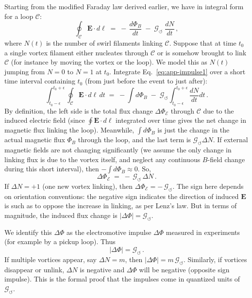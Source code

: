 \documentclass[12pt]{article}
\begin{document}
{Starting from the modified Faraday law derived earlier, we have in integral form for a loop $\mathcal{C}$:
\begin{equation}\label{eq:app-impulse1}
\oint_{\mathcal{C}} \mathbf{E}\cdot d\boldsymbol{\ell} \;=\; -\,\frac{d\Phi_{B}}{dt} \;-\; \mathcal{G}_{\!\boldsymbol{\circlearrowleft}}\;\frac{dN}{dt}\,,
\end{equation}
where $N(t)$ is the number of swirl filaments linking $\mathcal{C}$. Suppose that at time $t_0$ a single vortex filament either nucleates through $\mathcal{C}$ or is somehow brought to link $\mathcal{C}$ (for instance by moving the vortex or the loop). We model this as $N(t)$ jumping from $N=0$ to $N=1$ at $t_0$. Integrate Eq.~\eqref{eq:app-impulse1} over a short time interval containing $t_0$ (from just before the event to just after):
\begin{equation}\label{eq:app-impulse2}
\int_{t_0-\epsilon}^{t_0+\epsilon} \oint_{\mathcal{C}} \mathbf{E}\cdot d\boldsymbol{\ell}\, dt \;=\; -\int d\Phi_{B} \;-\; \mathcal{G}_{\!\boldsymbol{\circlearrowleft}} \int_{t_0-\epsilon}^{t_0+\epsilon} \frac{dN}{dt}dt\,.
\end{equation}
By definition, the left side is the total flux change $\Delta \Phi_{\mathcal{E}}$ through $\mathcal{C}$ due to the induced electric field (since $\oint \mathbf{E}\cdot d\ell$ integrated over time gives the net change in magnetic flux linking the loop). Meanwhile, $\int d\Phi_{B}$ is just the change in the actual magnetic flux $\Phi_{B}$ through the loop, and the last term is $\mathcal{G}_{\!\boldsymbol{\circlearrowleft}}\Delta N$. If external magnetic fields are not changing significantly (we assume the only change in linking flux is due to the vortex itself, and neglect any continuous $B$-field change during this short interval), then $-\int d\Phi_{B} \approx 0$. So,
\[
\Delta \Phi_{\mathcal{E}} \;=\; -\,\mathcal{G}_{\!\boldsymbol{\circlearrowleft}}\,\Delta N\,.
\]
If $\Delta N = +1$ (one new vortex linking), then $\Delta \Phi_{\mathcal{E}} = -\,\mathcal{G}_{\!\boldsymbol{\circlearrowleft}}$. The sign here depends on orientation conventions: the negative sign indicates the direction of induced $\mathbf{E}$ is such as to oppose the increase in linking, as per Lenz’s law. But in terms of magnitude, the induced flux change is $|\Delta \Phi| = \mathcal{G}_{\!\boldsymbol{\circlearrowleft}}$.

We identify this $\Delta \Phi$ as the electromotive impulse $\Delta\Phi$ measured in experiments (for example by a pickup loop). Thus
\[
|\Delta\Phi| = \mathcal{G}_{\!\boldsymbol{\circlearrowleft}}\,.
\]
If multiple vortices appear, say $\Delta N = m$, then $|\Delta\Phi| = m\, \mathcal{G}_{\!\boldsymbol{\circlearrowleft}}$. Similarly, if vortices disappear or unlink, $\Delta N$ is negative and $\Delta \Phi$ will be negative (opposite sign impulse). This is the formal proof that the impulses come in quantized units of $\mathcal{G}_{\!\boldsymbol{\circlearrowleft}}$.

}
\end{document}
